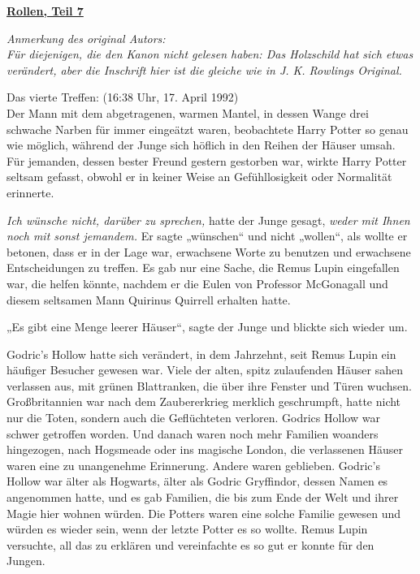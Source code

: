 

\hypertarget{rollen-teil-7}{%

\textbf{\uline{Rollen, Teil 7}}

\emph{Anmerkung des original Autors:}\\ \emph{Für diejenigen, die den Kanon nicht gelesen haben: Das Holzschild hat sich etwas verändert, aber die Inschrift hier ist die gleiche wie in J. K. Rowlings Original.}

\hfill\break Das vierte Treffen: (16:38 Uhr, 17. April 1992)\\ Der Mann mit dem abgetragenen, warmen Mantel, in dessen Wange drei schwache Narben für immer eingeätzt waren, beobachtete Harry Potter so genau wie möglich, während der Junge sich höflich in den Reihen der Häuser umsah. Für jemanden, dessen bester Freund gestern gestorben war, wirkte Harry Potter seltsam gefasst, obwohl er in keiner Weise an Gefühllosigkeit oder Normalität erinnerte.

\emph{Ich wünsche nicht, darüber zu sprechen,} hatte der Junge gesagt, \emph{weder mit Ihnen noch mit sonst jemandem.} Er sagte „wünschen“ und nicht „wollen“, als wollte er betonen, dass er in der Lage war, erwachsene Worte zu benutzen und erwachsene Entscheidungen zu treffen. Es gab nur eine Sache, die Remus Lupin eingefallen war, die helfen könnte, nachdem er die Eulen von Professor McGonagall und diesem seltsamen Mann Quirinus Quirrell erhalten hatte.

„Es gibt eine Menge leerer Häuser“, sagte der Junge und blickte sich wieder um.

Godric's Hollow hatte sich verändert, in dem Jahrzehnt, seit Remus Lupin ein häufiger Besucher gewesen war. Viele der alten, spitz zulaufenden Häuser sahen verlassen aus, mit grünen Blattranken, die über ihre Fenster und Türen wuchsen. Großbritannien war nach dem Zaubererkrieg merklich geschrumpft, hatte nicht nur die Toten, sondern auch die Geflüchteten verloren. Godrics Hollow war schwer getroffen worden. Und danach waren noch mehr Familien woanders hingezogen, nach Hogsmeade oder ins magische London, die verlassenen Häuser waren eine zu unangenehme Erinnerung. Andere waren geblieben. Godric's Hollow war älter als Hogwarts, älter als Godric Gryffindor, dessen Namen es angenommen hatte, und es gab Familien, die bis zum Ende der Welt und ihrer Magie hier wohnen würden. Die Potters waren eine solche Familie gewesen und würden es wieder sein, wenn der letzte Potter es so wollte. Remus Lupin versuchte, all das zu erklären und vereinfachte es so gut er konnte für den Jungen.

}
